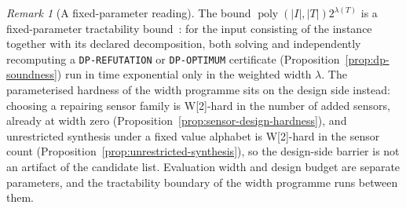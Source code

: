 \documentclass[11pt]{article}
\theoremstyle{plain}
\theoremstyle{definition}
\theoremstyle{remark}
\newtheorem{remark}[theorem]{Remark}
\begin{document}
\begin{remark}[A fixed-parameter reading]
\label{rem:fpt-reading}
The bound \(\operatorname{poly}(|I|,|T|)2^{\lambda(T)}\) is a fixed-parameter
tractability bound~\cite{downey-fellows99}: for the input consisting of the
instance together with its declared decomposition, both solving and
independently recomputing a \texttt{DP-REFUTATION} or \texttt{DP-OPTIMUM}
certificate (Proposition~\ref{prop:dp-soundness}) run in time exponential
only in the weighted width \(\lambda\).  The parameterised hardness of the
width programme sits on the design side instead: choosing a repairing sensor
family is W[2]-hard in the number of added sensors, already at width zero
(Proposition~\ref{prop:sensor-design-hardness}), and unrestricted synthesis
under a fixed value alphabet is W[2]-hard in the sensor count
(Proposition~\ref{prop:unrestricted-synthesis}), so the design-side barrier
is not an artifact of the candidate list.  Evaluation width and design
budget are separate parameters, and the tractability boundary of the width
programme runs between them.
\end{remark}
\end{document}
